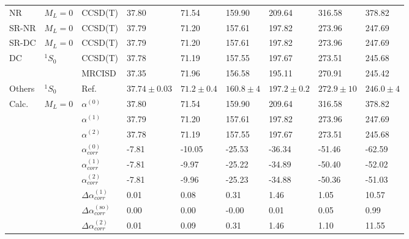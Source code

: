 \begin{longtable}{lllllllll}
\bottomrule
\endlastfoot
NR & $M_L=0$ & CCSD(T) &           37.80 &         71.54 &       159.90 &         209.64 &        316.58 &       378.82 \\
SR-NR & $M_L=0$ & CCSD(T) &           37.79 &         71.20 &       157.61 &         197.82 &        273.96 &       247.69 \\
SR-DC & $M_L=0$ & CCSD(T) &           37.79 &         71.20 &       157.61 &         197.82 &        273.96 &       247.69 \\
DC & $^1S_0$ & CCSD(T) &           37.78 &         71.19 &       157.55 &         197.67 &        273.51 &       245.68 \\
      &         & MRCISD &           37.35 &         71.96 &       156.58 &         195.11 &        270.91 &       245.42 \\
Others & $^1S_0$ & Ref. \cite{Schwerdtfeger2019} &  $37.74\pm0.03$ &  $71.2\pm0.4$ &  $160.8\pm4$ &  $197.2\pm0.2$ &  $272.9\pm10$ &  $246.0\pm4$ \\
Calc. & $M_L=0$ & $\alpha^{(0)}$ &           37.80 &         71.54 &       159.90 &         209.64 &        316.58 &       378.82 \\
      &         & $\alpha^{(1)}$ &           37.79 &         71.20 &       157.61 &         197.82 &        273.96 &       247.69 \\
      &         & $\alpha^{(2)}$ &           37.78 &         71.19 &       157.55 &         197.67 &        273.51 &       245.68 \\
      &         & $\alpha_{corr}^{(0)}$ &           -7.81 &        -10.05 &       -25.53 &         -36.34 &        -51.46 &       -62.59 \\
      &         & $\alpha_{corr}^{(1)}$ &           -7.81 &         -9.97 &       -25.22 &         -34.89 &        -50.40 &       -52.02 \\
      &         & $\alpha_{corr}^{(2)}$ &           -7.81 &         -9.96 &       -25.23 &         -34.88 &        -50.36 &       -51.03 \\
      &         & $\Delta \alpha_{corr}^{(\text{1})}$ &            0.01 &          0.08 &         0.31 &           1.46 &          1.05 &        10.57 \\
      &         & $\Delta \alpha_{corr}^{(\text{so})}$ &            0.00 &          0.00 &        -0.00 &           0.01 &          0.05 &         0.99 \\
      &         & $\Delta \alpha_{corr}^{(\text{2})}$ &            0.01 &          0.09 &         0.31 &           1.46 &          1.10 &        11.55 \\

\end{longtable}
